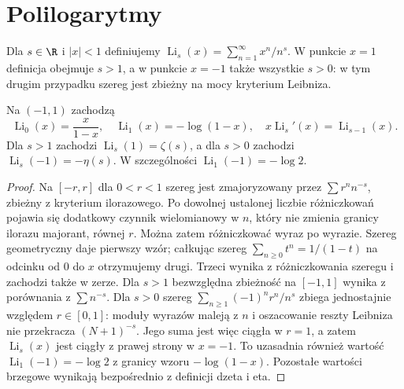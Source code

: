 \section{Polilogarytmy}
\begin{definicja}
\label{ma1:def:polylog}
Dla $s\in\R$ i $|x|<1$ definiujemy
$\operatorname{Li}_s(x)=\sum_{n=1}^\infty x^n/n^s$.
W punkcie $x=1$ definicja obejmuje $s>1$,
a w punkcie $x=-1$ także wszystkie $s>0$:
w tym drugim przypadku szereg jest zbieżny
na mocy kryterium Leibniza.
\end{definicja}
\begin{stwierdzenie}
\label{ma1:prop:polylog}
Na $(-1,1)$ zachodzą
\[
 \operatorname{Li}_0(x)=\frac{x}{1-x},\quad
 \operatorname{Li}_1(x)=-\log(1-x),\quad
 x\operatorname{Li}_s'(x)=\operatorname{Li}_{s-1}(x).
\]
Dla $s>1$ zachodzi $\operatorname{Li}_s(1)=\zeta(s)$,
a dla $s>0$ zachodzi $\operatorname{Li}_s(-1)=-\eta(s)$.
W szczególności $\operatorname{Li}_1(-1)=-\log 2$.
\end{stwierdzenie}
\begin{proof}
Na $[-r,r]$ dla $0<r<1$ szereg jest zmajoryzowany
przez $\sum r^n n^{-s}$, zbieżny z kryterium
ilorazowego. Po dowolnej ustalonej liczbie
różniczkowań pojawia się dodatkowy czynnik
wielomianowy w $n$, który nie zmienia granicy
ilorazu majorant, równej $r$.
Można zatem różniczkować wyraz po wyrazie.
Szereg geometryczny daje pierwszy wzór;
całkując szereg $\sum_{n\ge0}t^n=1/(1-t)$
na odcinku od $0$ do $x$ otrzymujemy drugi.
Trzeci wynika z różniczkowania szeregu i zachodzi
także w zerze. Dla $s>1$ bezwzględna zbieżność
na $[-1,1]$ wynika z porównania z $\sum n^{-s}$.
Dla $s>0$ szereg $\sum_{n\ge1}(-1)^n r^n/n^s$
zbiega jednostajnie względem $r\in[0,1]$:
moduły wyrazów maleją z $n$ i oszacowanie reszty
Leibniza nie przekracza $(N+1)^{-s}$.
Jego suma jest więc ciągła w $r=1$,
a zatem $\operatorname{Li}_s(x)$ jest ciągły
z prawej strony w $x=-1$.
To uzasadnia również wartość
$\operatorname{Li}_1(-1)=-\log 2$ z granicy wzoru
$-\log(1-x)$. Pozostałe wartości brzegowe wynikają
bezpośrednio z definicji dzeta i eta.
\end{proof}
